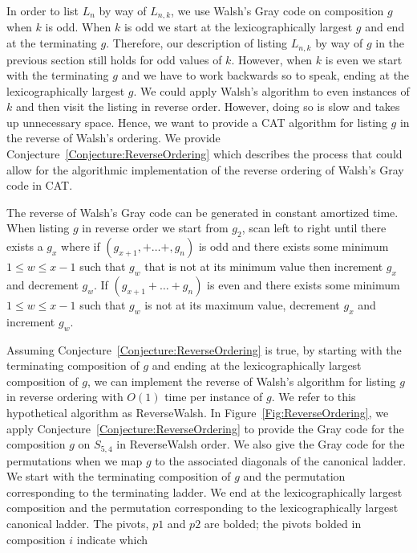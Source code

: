 \begin{theorem}
\begin{theorem}
In order to list $L_{n}$ by way of $L_{n,k}$, we use Walsh's Gray code on composition $g$ when $k$ is odd. 
When $k$ is odd we start at the lexicographically largest $g$ and end at the terminating $g$. Therefore, our description of 
listing $L_{n,k}$ by way of $g$ in the previous section still holds for odd values of $k$. However, when $k$ is even we 
start with the terminating $g$ and we have to work backwards so to speak, ending at the lexicographically largest $g$. 
We could apply Walsh's algorithm to even instances of $k$ and then visit the listing in reverse order. However, doing so 
is slow and takes up unnecessary space. Hence, we want to provide a CAT algorithm for listing 
$g$ in the reverse of Walsh's ordering. We provide Conjecture~\ref{Conjecture:ReverseOrdering} which describes the 
process that could allow for the algorithmic implementation of the reverse ordering of Walsh's Gray code in CAT.
\begin{conjecture}
  The reverse of Walsh's Gray code can be generated in constant amortized time. 
  When listing $g$ in reverse order we start from $g_{2}$, 
  scan left to right until there exists a $g_{x}$ where if $(g_{x+1}, + \dots + ,g_{n})$ is odd and there exists some minimum $1 \leq w \leq x-1$ 
  such that $g_{w}$ that is not at its minimum value then increment $g_{x}$ and decrement $g_{w}$. If $(g_{x+1} + \dots +g_{n})$ is even and there 
  exists some minimum $1 \leq w \leq x-1$ such that $g_{w}$ is not at its maximum value, decrement $g_{x}$ and increment $g_{w}$. 
  \label{Conjecture:ReverseOrdering}
\end{conjecture}
Assuming Conjecture~\ref{Conjecture:ReverseOrdering} is true, by starting with the terminating composition of $g$ and ending at the 
lexicographically largest composition of $g$, we can implement the reverse of Walsh's algorithm for listing $g$ in reverse ordering with $O(1)$ time per instance of $g$. 
We refer to this hypothetical algorithm as {\sc ReverseWalsh}. 
In Figure~\ref{Fig:ReverseOrdering}, we apply Conjecture~\ref{Conjecture:ReverseOrdering}
to provide the Gray code for the composition $g$ on $S_{5,4}$ in {\sc ReverseWalsh} order. We also give
 the Gray code for the permutations when we map $g$ to the associated diagonals of the canonical ladder. 
We start with the terminating composition of $g$ 
and the permutation corresponding to the terminating ladder. We end at the lexicographically largest composition and the permutation corresponding 
to the lexicographically largest canonical ladder. The pivots, $p1$ and $p2$ are bolded; the pivots bolded in composition $i$ indicate which 

\end{theorem}
\end{theorem}
